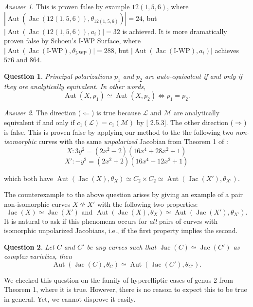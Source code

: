 \documentclass[12pt,reqno]{amsart}
\DeclareMathOperator{\Aut}{Aut}
\DeclareMathOperator{\Jac}{Jac}
\newcommand{\mc}{\mathcal}
\newtheorem*{question}{Question}
\theoremstyle{definition}
\theoremstyle{remark}
\newtheorem*{answer}{Answer}
\begin{document}
\begin{answer} This is proven false by example $12(1,5,6)$, where $|\Aut(\Jac(12(1, 5, 6)), \theta_{12(1, 5, 6)})| = 24$, but $|\Aut(\Jac(12(1, 5, 6)), a_i)| = 32$ is achieved. It is more dramatically proven false by Schoen's I-WP Surface, where $|\Aut(\Jac(\text{I-WP}), \theta_{\text{I-WP}})| = 288$, but $|\Aut(\Jac(\text{I-WP}), a_i)|$ achieves $576$ and $864$. \end{answer}

\begin{question} Principal polarizations $p_1$ and $p_2$ are auto-equivalent if and only if they are analytically equivalent. In other words, $$\Aut(X, p_1) \simeq \Aut(X, p_2) \Leftrightarrow p_1 = p_2.$$ \end{question}

\begin{answer} The direction ($\Leftarrow$) is true because $\mc{L}$ and $\mc{M}$ are analytically equivalent if and only if $c_1(\mc{L}) = c_1(\mc{M})$ by [\cite{bl} 2.5.3]. The other direction ($\Rightarrow$) is false.  This is proven false by applying our method to the the following two \textit{non-isomorphic} curves with the same \textit{unpolarized} Jacobian from Theorem 1 of \cite{howe1}:
\vspace{-2pt}
$$X: 3y^2 = (2x^2- 2)(16x^4 + 28x^2 + 1)$$ 
\vspace{-15pt}
$$X': -y^2 = (2x^2 + 2)(16x^4 + 12x^2 + 1)$$ 

\noindent which both have $\Aut(\Jac(X), \theta_X)\simeq C_2 \times C_2 \simeq \Aut(\Jac(X'), \theta_{X'})$. \end{answer}

The counterexample to the above question arises by giving an example of a pair non-isomorphic curves $X \nsimeq X'$ with the following two properties: $$\Jac(X) \simeq \Jac(X') \text{  and  }  \Aut(\Jac(X), \theta_X) \simeq \Aut(\Jac(X'), \theta_{X'}).$$ It is natural to ask if this phenomena occurs for \textit{all} pairs of curves with isomorphic unpolarized Jacobians, i.e., if the first property implies the second.

\begin{question} Let $C$ and $C'$ be any curves such that $\Jac(C) \simeq \Jac(C')$ as complex varieties, then $$\Aut(\Jac(C), \theta_C) \simeq \Aut(\Jac(C'), \theta_{C'}).$$  \end{question} 

We checked this question on the family of hyperelliptic cases of genus 2 from \cite{howe1} Theorem 1, where it is true. However, there is no reason to expect this to be true in general. Yet, we cannot disprove it easily. 
\end{document}
